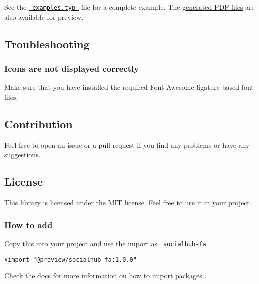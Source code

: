 See the
\href{https://github.com/typst/packages/raw/main/packages/preview/socialhub-fa/1.0.0/examples/examples.typ}{\texttt{\ examples.typ\ }}
file for a complete example. The
\href{https://github.com/typst/packages/raw/main/packages/preview/socialhub-fa/1.0.0/examples/}{generated
PDF files} are also available for preview.

\subsection{Troubleshooting}\label{troubleshooting}

\subsubsection{Icons are not displayed
correctly}\label{icons-are-not-displayed-correctly}

Make sure that you have installed the required Font Awesome
ligature-based font files.

\subsection{Contribution}\label{contribution}

Feel free to open an issue or a pull request if you find any problems or
have any suggestions.

\subsection{License}\label{license}

This library is licensed under the MIT license. Feel free to use it in
your project.

\subsubsection{How to add}\label{how-to-add}

Copy this into your project and use the import as
\texttt{\ socialhub-fa\ }

\begin{verbatim}
#import "@preview/socialhub-fa:1.0.0"
\end{verbatim}



Check the docs for
\href{https://typst.app/docs/reference/scripting/\#packages}{more
information on how to import packages} .

